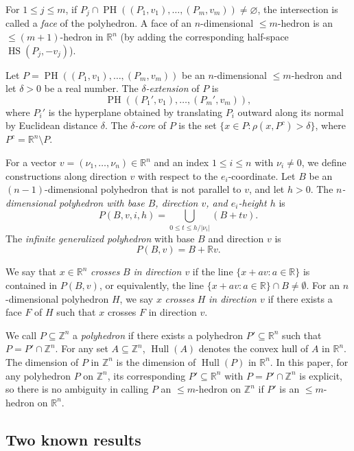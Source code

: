 \documentclass{amsart}
\theoremstyle{definition}
\newcommand{\Z}{\mathbb Z}
\newcommand{\R}{\mathbb R}
\DeclareMathOperator{\Hull}{Hull}
\begin{document}
For $1\leq j\leq m$, if
$P_j\cap \operatorname{PH}((P_1,v_1),\dots,(P_m,v_m))\neq\varnothing$,
the intersection is called a {\em face} of the polyhedron. A face of an
$n$-dimensional $\leq\!\! m$-hedron is an $\leq\!\! (m+1)$-hedron in $\R^n$ (by adding the corresponding half-space $\operatorname{HS}(P_j,-v_j)$).

Let $P=\operatorname{PH}((P_1,v_1),\dots,(P_m,v_m))$ be an $n$-dimensional
$\leq\!\!\! m$-hedron and let $\delta>0$ be a real number. The
{\em $\delta$-extension} of $P$ is
\[
\operatorname{PH}((P_1',v_1),\dots,(P_m',v_m)),
\]
where $P_i'$ is the hyperplane obtained by translating $P_i$
outward along its normal by Euclidean distance $\delta$. The
{\em $\delta$-core} of $P$ is the set
$\{x\in P\colon \rho(x, P^c)>\delta\}$, where
$P^c=\mathbb{R}^n\setminus P$.

For a vector $v=(\nu_1,\dots,\nu_n)\in\mathbb{R}^n$ and an index
$1\leq i\leq n$ with $\nu_i\neq 0$, we define constructions along direction
$v$ with respect to the $e_i$-coordinate. Let $B$ be an $(n-1)$-dimensional
polyhedron that is not parallel to $v$, and let $h>0$. The {\em $n$-dimensional polyhedron with base $B$,
direction $v$, and $e_i$-height $h$} is
\[
P(B, v, i, h)=\bigcup_{0\leq t\leq h/|\nu_i|} (B+tv).
\]
The {\em infinite generalized polyhedron} with base $B$ and direction $v$ is
\[
P(B, v)=B+\mathbb{R}v.
\]

We say that $x\in\mathbb{R}^n$ {\em crosses} $B$ {\em in direction $v$} if
the line $\{x+av\colon a\in\mathbb{R}\}$ is contained in $P(B,v)$, or equivalently, the line $\{x+av\colon a\in\mathbb{R}\}\cap B\neq\emptyset$. For an
$n$-dimensional polyhedron $H$, we say $x$ {\em crosses} $H$ {\em in
direction $v$} if there exists a face $F$ of $H$ such that $x$ crosses $F$
in direction $v$.

We call $P\subseteq\mathbb{Z}^n$ a {\em polyhedron} if there exists a polyhedron $P'\subseteq\mathbb{R}^n$ such that $P=P'\cap\mathbb{Z}^n$. For any set $A\subseteq\mathbb{Z}^n$,
$\Hull(A)$ denotes the convex hull of $A$ in $\mathbb{R}^n$. The dimension of $P$ in $\Z^n$ is the dimension of $\Hull(P)$ in $\R^n$. In this paper, for any polyhedron $P$ on $\Z^n$, its corresponding $P'\subseteq\R^n$ with $P=P'\cap\Z^n$ is explicit, so there is no ambiguity in calling $P$ an $\leq\!\! m$-hedron on $\Z^n$ if $P'$ is an $\leq\!\! m$-hedron on $\R^n$.

\subsection{Two known results}
\end{document}
